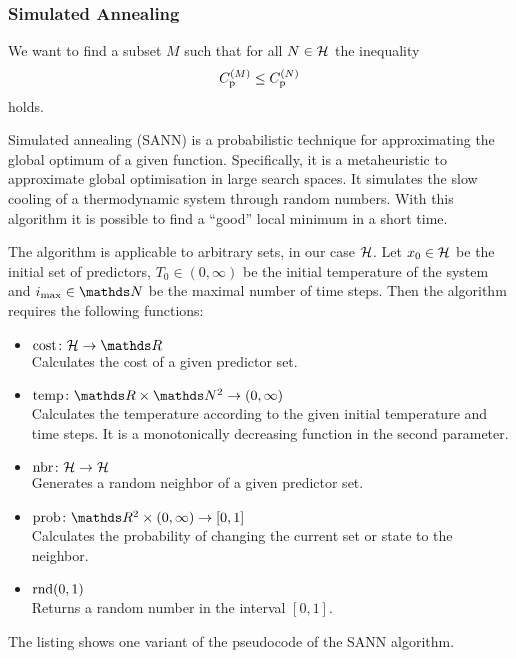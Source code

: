 		\subsubsection{Simulated Annealing}
		\label{sssec:simulated-annealing}
	
			We want to find a subset $M$ such that for all $N\in\mathcal{H}$ the inequality
			\[
				C_{\mathrm{p}}^{(M)} \leq C_{\mathrm{p}}^{(N)}
			\]
			holds.

			Simulated annealing (SANN) is a probabilistic technique for approximating the global optimum of a given function.
			Specifically, it is a metaheuristic to approximate global optimisation in large search spaces.
			It simulates the slow cooling of a thermodynamic system through random numbers.
			With this algorithm it is possible to find a \enquote{good} local minimum in a short time.

			The algorithm is applicable to arbitrary sets, in our case $\mathcal{H}$.
			Let $x_0\in\mathcal{H}$ be the initial set of predictors, $T_0\in(0,\infty)$ be the initial temperature of the system and $i_\m{max}\in\SN$ be the maximal number of time steps.
			Then the algorithm requires the following functions:
			\begin{itemize}
				\item $\func{\m{cost}}{\s{H}}{\SR}$ \\
					Calculates the cost of a given predictor set.
				\item $\func{\m{temp}}{\SR\times\SN^2}{(0,\infty)}$\\
					Calculates the temperature according to the given initial temperature and time steps.
					It is a monotonically decreasing function in the second parameter.
				\item $\mathrm{nbr}\colon\mathcal{H}\to\mathcal{H}$ \\
					Generates a random neighbor of a given predictor set.
				\item $\func{\m{prob}}{\SR^2\times(0,\infty)}{[0,1]}$ \\
					Calculates the probability of changing the current set or state to the neighbor.
				\item $\mathrm{rnd}(0,1)$ \\
					Returns a random number in the interval $[0,1]$.
			\end{itemize}
			The listing shows one variant of the pseudocode of the SANN algorithm. 

